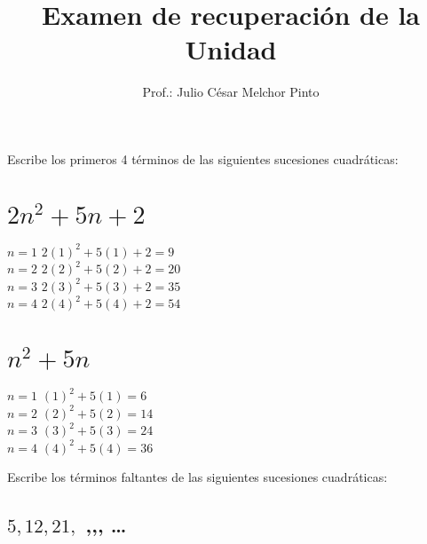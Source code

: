 \documentclass[12pt,addpoints]{evalua}
\title{Examen de {\color{brown}recuperación} de la Unidad}
\author{Prof.: Julio César Melchor Pinto}
\begin{document}
%

\begin{multicols}{2}
    
    
\end{multicols}
\begin{questions}\large
    \question[10] Escribe los primeros 4 términos de las siguientes sucesiones cuadráticas:

    \begin{multicols}{2}
        \begin{parts}
            \part { \Large$2n^2+5n+2$} \hfill \fillin[$9,20,35,54$][0cm]

            \begin{solutionbox}{4cm}
                $n=1$ \quad $2(1)^2+5(1)+2=9$ \\
                $n=2$ \quad $2(2)^2+5(2)+2=20$ \\
                $n=3$ \quad $2(3)^2+5(3)+2=35$ \\
                $n=4$ \quad $2(4)^2+5(4)+2=54$
            \end{solutionbox}

            \part {\Large $n^2+5n$} \hfill \fillin[$6,14,24,36$][0cm]

            \begin{solutionbox}{4cm}
                $n=1$ \quad $(1)^2+5(1)=6$ \\
                $n=2$ \quad $(2)^2+5(2)=14$ \\
                $n=3$ \quad $(3)^2+5(3)=24$ \\
                $n=4$ \quad $(4)^2+5(4)=36$
            \end{solutionbox}
        \end{parts}
    \end{multicols}

    \question[10] Escribe los términos faltantes de las siguientes sucesiones cuadráticas:

    \begin{multicols}{2}
        \begin{parts}
            \part { \Large$5,12,21,$ \fillin[32][0.5cm],\fillin[45][0.5cm],\fillin[60][0.5cm], \dots}


\end{parts}
\end{multicols}
\end{questions}
\end{document}

